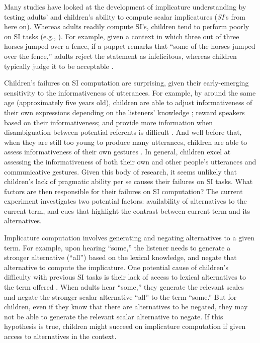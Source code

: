 \documentclass[10pt,letterpaper]{article}
\begin{document}
Many studies have looked at the development of implicature understanding by testing adults' and children's ability to compute scalar implicatures (\emph{SI}'s from here on). Whereas adults readily compute SI's, children tend to perform poorly on SI tasks (e.g., ). For example, given a context in which three out of three horses jumped over a fence, if a puppet remarks that ``some of the horses jumped over the fence,'' adults reject the statement as infelicitous, whereas children typically judge it to be acceptable \cite{papafragou2003scalar}. 

Children's failures on SI computation are surprising, given their early-emerging sensitivity to the informativeness of utterances. For example, by around the same age (approximately five years old), children are able to adjust informativeness of their own expressions depending on the listeners' knowledge \cite{matthews2006effect}; reward speakers based on their informativeness\cite{katsos2011pragmatic}; and provide more information when disambiguation between potential referents is difficult \cite{matthews2012two}. And well before that, when they are still too young to produce many utterances, children are able to assess informativeness of their own gestures \cite{o2001two}. In general, children excel at assessing the informativeness of both their own and other people's utterances and communicative gestures. Given this body of research, it seems unlikely that children's lack of pragmatic ability per se causes their failures on SI tasks. What factors are then responsible for their failures on SI computation? The current experiment investigates two potential factors: availability of alternatives to the current term, and cues that highlight the contrast between current term and its alternatives. 

Implicature computation involves generating and negating alternatives to a given term. For example, upon hearing ``some,'' the listener needs to generate a stronger alternative (``all'') based on the lexical knowledge, and negate that alternative to compute the implicature. One potential cause of children's difficulty with previous SI tasks is their lack of access to lexical alternatives to the term offered \cite{barner2011accessing}. When adults hear ``some,'' they generate the relevant scales and negate the stronger scalar alternative ``all'' to the term ``some.'' But for children, even if they know that there are alternatives to be negated, they may not be able to generate the relevant scalar alternative to negate. If this hypothesis is true, children might succeed on implicature computation if given access to alternatives in the context.
\end{document}
